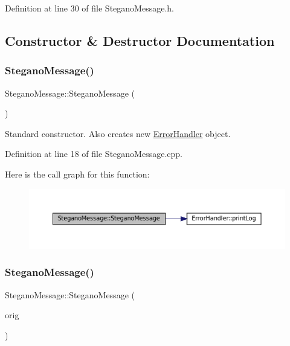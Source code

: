 Definition at line 30 of file Stegano\+Message.\+h.



\subsection{Constructor \& Destructor Documentation}
\mbox{\label{classSteganoMessage_a7a14cbd03ebca6764f8b234f8dcd1697}} 
\subsubsection{\texorpdfstring{SteganoMessage()}{SteganoMessage()}\hspace{0.1cm}{\footnotesize\ttfamily [1/2]}}
{\footnotesize\ttfamily Stegano\+Message\+::\+Stegano\+Message (\begin{DoxyParamCaption}{ }\end{DoxyParamCaption})}



Standard constructor. Also creates new \mbox{\hyperlink{classErrorHandler}{Error\+Handler}} object. 



Definition at line 18 of file Stegano\+Message.\+cpp.

Here is the call graph for this function\+:
\nopagebreak
\begin{figure}[H]
\begin{center}
\leavevmode
\includegraphics[width=350pt]{classSteganoMessage_a7a14cbd03ebca6764f8b234f8dcd1697_cgraph}
\end{center}
\end{figure}
\mbox{\label{classSteganoMessage_a67a8a4a8aae12db32bb758e6cd44b16a}} 
\subsubsection{\texorpdfstring{SteganoMessage()}{SteganoMessage()}\hspace{0.1cm}{\footnotesize\ttfamily [2/2]}}
{\footnotesize\ttfamily Stegano\+Message\+::\+Stegano\+Message (\begin{DoxyParamCaption}\item[{const \mbox{\hyperlink{classSteganoMessage}{Stegano\+Message}} \&}]{orig }\end{DoxyParamCaption})}



